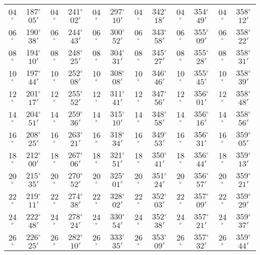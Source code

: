 \begin{table}
{\begin{tabular}{cc|cc|cc|cc|cc|cc}
04$^\circ$ & 187$^\circ$$05'$ & 04$^\circ$ & 241$^\circ$$02'$ & 04$^\circ$ & 297$^\circ$$10'$ & 04$^\circ$ & 342$^\circ$$18'$ &  04$^\circ$ & 354$^\circ$$49'$ & 04$^\circ$ & 358$^\circ$$12'$\\
06$^\circ$ & 190$^\circ$$38'$ & 06$^\circ$ & 244$^\circ$$43'$ & 06$^\circ$ & 300$^\circ$$52'$ & 06$^\circ$ & 343$^\circ$$58'$ &  06$^\circ$ & 355$^\circ$$09'$ & 06$^\circ$ & 358$^\circ$$22'$\\
08$^\circ$ & 194$^\circ$$10'$ & 08$^\circ$ & 248$^\circ$$25'$ & 08$^\circ$ & 304$^\circ$$31'$ & 08$^\circ$ & 345$^\circ$$27'$ &  08$^\circ$ & 355$^\circ$$28'$ & 08$^\circ$ & 358$^\circ$$31'$\\
10$^\circ$ & 197$^\circ$$44'$ & 10$^\circ$ & 252$^\circ$$08'$ & 10$^\circ$ & 308$^\circ$$08'$ & 10$^\circ$ & 346$^\circ$$46'$ &  10$^\circ$ & 355$^\circ$$45'$ & 10$^\circ$ & 358$^\circ$$39'$\\
12$^\circ$ & 201$^\circ$$17'$ & 12$^\circ$ & 255$^\circ$$52'$ & 12$^\circ$ & 311$^\circ$$41'$ & 12$^\circ$ & 347$^\circ$$56'$ &  12$^\circ$ & 356$^\circ$$01'$ & 12$^\circ$ & 358$^\circ$$48'$\\
14$^\circ$ & 204$^\circ$$51'$ & 14$^\circ$ & 259$^\circ$$36'$ & 14$^\circ$ & 315$^\circ$$10'$ & 14$^\circ$ & 348$^\circ$$58'$ &  14$^\circ$ & 356$^\circ$$16'$ & 14$^\circ$ & 358$^\circ$$56'$\\
16$^\circ$ & 208$^\circ$$25'$ & 16$^\circ$ & 263$^\circ$$21'$ & 16$^\circ$ & 318$^\circ$$34'$ & 16$^\circ$ & 349$^\circ$$53'$ &  16$^\circ$ & 356$^\circ$$31'$ & 16$^\circ$ & 359$^\circ$$05'$\\
18$^\circ$ & 212$^\circ$$00'$ & 18$^\circ$ & 267$^\circ$$06'$ & 18$^\circ$ & 321$^\circ$$51'$ & 18$^\circ$ & 350$^\circ$$41'$ &  18$^\circ$ & 356$^\circ$$44'$ & 18$^\circ$ & 359$^\circ$$13'$\\
20$^\circ$ & 215$^\circ$$35'$ & 20$^\circ$ & 270$^\circ$$52'$ & 20$^\circ$ & 325$^\circ$$01'$ & 20$^\circ$ & 351$^\circ$$24'$ &  20$^\circ$ & 356$^\circ$$57'$ & 20$^\circ$ & 359$^\circ$$21'$\\
22$^\circ$ & 219$^\circ$$11'$ & 22$^\circ$ & 274$^\circ$$38'$ & 22$^\circ$ & 328$^\circ$$02'$ & 22$^\circ$ & 352$^\circ$$03'$ &  22$^\circ$ & 357$^\circ$$09'$ & 22$^\circ$ & 359$^\circ$$29'$\\
24$^\circ$ & 222$^\circ$$48'$ & 24$^\circ$ & 278$^\circ$$24'$ & 24$^\circ$ & 330$^\circ$$54'$ & 24$^\circ$ & 352$^\circ$$38'$ &  24$^\circ$ & 357$^\circ$$21'$ & 24$^\circ$ & 359$^\circ$$37'$\\
26$^\circ$ & 226$^\circ$$25'$ & 26$^\circ$ & 282$^\circ$$10'$ & 26$^\circ$ & 333$^\circ$$35'$ & 26$^\circ$ & 353$^\circ$$09'$ &  26$^\circ$ & 357$^\circ$$32'$ & 26$^\circ$ & 359$^\circ$$44'$\\

\end{tabular}}
\end{table}
